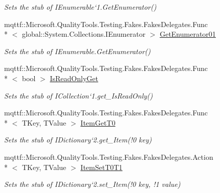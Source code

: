 \begin{DoxyCompactItemize}
\begin{DoxyCompactList}\small\item\em Sets the stub of I\-Enumerable`1.Get\-Enumerator()\end{DoxyCompactList}\item 
mqttf\-::\-Microsoft.\-Quality\-Tools.\-Testing.\-Fakes.\-Fakes\-Delegates.\-Func\\*
$<$ global\-::\-System.\-Collections.\-I\-Enumerator $>$ \hyperlink{class_system_1_1_collections_1_1_generic_1_1_fakes_1_1_stub_i_dictionary_3_01_t_key_00_01_t_value_01_4_a721781bbf2fc1fca79be7004d20decb8}{Get\-Enumerator01}
\begin{DoxyCompactList}\small\item\em Sets the stub of I\-Enumerable.\-Get\-Enumerator()\end{DoxyCompactList}\item 
mqttf\-::\-Microsoft.\-Quality\-Tools.\-Testing.\-Fakes.\-Fakes\-Delegates.\-Func\\*
$<$ bool $>$ \hyperlink{class_system_1_1_collections_1_1_generic_1_1_fakes_1_1_stub_i_dictionary_3_01_t_key_00_01_t_value_01_4_ad187a35b710736b66b7cc14bdf29b7e8}{Is\-Read\-Only\-Get}
\begin{DoxyCompactList}\small\item\em Sets the stub of I\-Collection`1.get\-\_\-\-Is\-Read\-Only()\end{DoxyCompactList}\item 
mqttf\-::\-Microsoft.\-Quality\-Tools.\-Testing.\-Fakes.\-Fakes\-Delegates.\-Func\\*
$<$ T\-Key, T\-Value $>$ \hyperlink{class_system_1_1_collections_1_1_generic_1_1_fakes_1_1_stub_i_dictionary_3_01_t_key_00_01_t_value_01_4_aa799f4d9a47df00de5da34360beed839}{Item\-Get\-T0}
\begin{DoxyCompactList}\small\item\em Sets the stub of I\-Dictionary`2.get\-\_\-\-Item(!0 key)\end{DoxyCompactList}\item 
mqttf\-::\-Microsoft.\-Quality\-Tools.\-Testing.\-Fakes.\-Fakes\-Delegates.\-Action\\*
$<$ T\-Key, T\-Value $>$ \hyperlink{class_system_1_1_collections_1_1_generic_1_1_fakes_1_1_stub_i_dictionary_3_01_t_key_00_01_t_value_01_4_a2271bb7b5e25bcc3b8e2731342e2a358}{Item\-Set\-T0\-T1}
\begin{DoxyCompactList}\small\item\em Sets the stub of I\-Dictionary`2.set\-\_\-\-Item(!0 key, !1 value)\end{DoxyCompactList}\item 

\end{DoxyCompactItemize}
